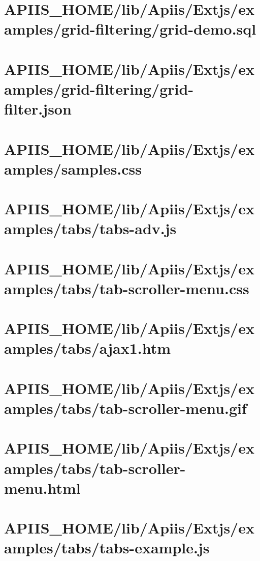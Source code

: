 \section{APIIS\_HOME/lib/Apiis/Extjs/examples/grid-filtering/grid-demo.sql} 
\section{APIIS\_HOME/lib/Apiis/Extjs/examples/grid-filtering/grid-filter.json} 
\section{APIIS\_HOME/lib/Apiis/Extjs/examples/samples.css} 
\section{APIIS\_HOME/lib/Apiis/Extjs/examples/tabs/tabs-adv.js} 
\section{APIIS\_HOME/lib/Apiis/Extjs/examples/tabs/tab-scroller-menu.css} 
\section{APIIS\_HOME/lib/Apiis/Extjs/examples/tabs/ajax1.htm} 
\section{APIIS\_HOME/lib/Apiis/Extjs/examples/tabs/tab-scroller-menu.gif} 
\section{APIIS\_HOME/lib/Apiis/Extjs/examples/tabs/tab-scroller-menu.html} 
\section{APIIS\_HOME/lib/Apiis/Extjs/examples/tabs/tabs-example.js} 

